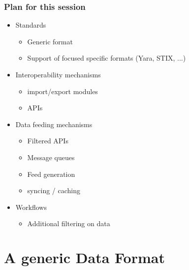 
\begin{frame}[t,plain]
\titlepage
\end{frame}

\begin{frame}
	\frametitle{Plan for this session}
	\begin{itemize}
		\item Standards
        \begin{itemize}
            \item Generic format
            \item Support of focused specific formats (Yara, STIX, ...)
        \end{itemize}
		\item Interoperability mechanisms
		\begin{itemize}
            \item import/export modules
            \item APIs
        \end{itemize}
        \item Data feeding mechanisms
        \begin{itemize}
            \item Filtered APIs
            \item Message queues
            \item Feed generation
            \item syncing / caching
        \end{itemize}
        \item Workflows
        \begin{itemize}
            \item Additional filtering on data
        \end{itemize}
	\end{itemize}
\end{frame}

\section{A generic Data Format}

